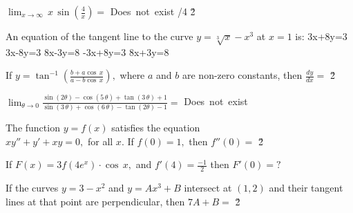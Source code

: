 \documentclass[amsfonts,bezier,leqno,fleqn,12pt,a4paper]{article}
\begin{document}
{{\begin{large}
\newpage



\item %
$\displaystyle \lim_{x\rightarrow\infty} \,x\,\sin\left(\frac{4}{x}\right)=$
\sc
\be
\mbox{Does not exist}
\ee
{}/4
\ee
{}
\ee
{}
\ee
{}
\ee
\v2



\item %
An equation of the tangent line to the curve $y=\sqrt[3]{x}-x^3$ at $x=1$ is:
\sc
\be
3x+8y=3
\ee
\be
3x-8y=3
\ee
\be
8x-3y=8
\ee
\be
-3x+8y=3
\ee
\be
8x+3y=8
\ee

\newpage



\item %
If $\displaystyle y=\tan^{-1} \left(\frac{b+a\cos\,x}{a-b\cos\,x}\right),$ where $a$ and $b$ are non-zero constants, then $\displaystyle \frac{dy}{dx}=$
\sc
\be
\displaystyle {}
\ee
\be
{}
\ee
\be
\displaystyle {}
\ee
\be
\displaystyle {}
\ee
\be
\displaystyle {}
\ee
\v2



\item %
$\displaystyle \lim_{\theta\rightarrow 0} \frac{\sin(2\theta)-\cos(5\,\theta)+\tan(3\,\theta)+1}{\sin(3\,\theta)+\cos(6\,\theta)-\tan(2\theta)-1}=$
\sc
{}
\ee
{}
\ee
\be
\mbox{Does not exist}
\ee
{}
\ee
{}
\ee

\newpage



\item %
The function $y=f(x)$ satisfies the equation\\ $xy''+y'+xy=0,$ for all $x$. If $f(0)=1,$ then $f''(0)=$
\sc
{}
\ee
\be
\displaystyle {}
\ee
{}
\ee
\be
\displaystyle {}
\ee
\be
\displaystyle {}
\ee
\v2



\item %
If $F(x)=3f(4e^{x})\cdot\cos\,x,$ and $\displaystyle f'(4)=\frac{-1}{2}$ then $F'(0)=?$
\sc
{}
\ee
{}
\ee
{}
\ee
{}
\ee
{}
\ee

\newpage



\item %
If the curves $y=3-x^2$ and $y=Ax^3+B$ intersect at $(1,2)$ and their tangent lines at that point are perpendicular, then $7A+B=$
\sc
{}
\ee
{}
\ee
{}
\ee
{}
\ee
{}
\ee
\v2




\end{large}}}
\end{document}
